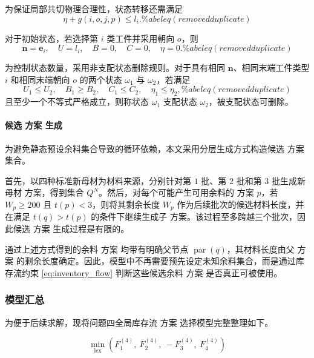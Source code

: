 \documentclass[UTF8]{ctexart}
\begin{document}
为保证局部共切物理合理性，状态转移还需满足
\begin{equation}
\eta+g(i,o,j,p)\leq l_i.
\% abel{eq} (removed duplicate)
\end{equation}

对于初始状态，若选择第 $i$ 类工件并采用朝向 $o$，则
\begin{equation}
\boldsymbol{n}=\boldsymbol{e}_i,\quad
U=l_i,\quad
B=0,\quad
C=0,\quad
\eta=0.
\% abel{eq} (removed duplicate)
\end{equation}

为控制状态数量，采用非支配状态删除规则。对于具有相同 $\boldsymbol{n}$、相同末端工件类型 $i$ 和相同末端朝向 $o$ 的两个状态 $\omega_1$ 与 $\omega_2$，若满足
\begin{equation}
U_1\leq U_2,\quad
B_1\geq B_2,\quad
C_1\leq C_2,\quad
\eta_1\leq \eta_2,
\% abel{eq} (removed duplicate)
\end{equation}
且至少一个不等式严格成立，则称状态 $\omega_1$ 支配状态 $\omega_2$，被支配状态可删除。

\paragraph{候选 方案 生成}

为避免静态预设余料集合导致的循环依赖，本文采用分层生成方式构造候选 方案 集合。

首先，以四种标准新母材为材料来源，分别针对第 $1$ 批、第 $2$ 批和第 $3$ 批生成新母材 方案，得到集合 $Q^N$。然后，对每个可能产生可用余料的 方案 $p$，若 $W_p\geq 200$ 且 $t(p)<3$，则将其剩余长度 $W_p$ 作为后续批次的候选材料长度，并在满足 $t(q)>t(p)$ 的条件下继续生成子 方案。该过程至多跨越三个批次，因此候选 方案 生成过程是有限的。

通过上述方式得到的余料 方案 均带有明确父节点 $\operatorname{par}(q)$，其材料长度由父 方案 的剩余长度确定。因此，模型中不再需要预先设定未知余料集合，而是通过库存流约束 \eqref{eq:inventory_flow} 判断这些候选余料 方案 是否真正可被使用。

\subsubsection{模型汇总}

为便于后续求解，现将问题四全局库存流 方案 选择模型完整整理如下。

\begin{equation}
\min_{\mathrm{lex}}\left(F_1^{(4)},\ F_2^{(4)},\ -F_3^{(4)},\ F_4^{(4)}\right)
\label{eq:p4_lexobj}
\end{equation}
\end{document}

